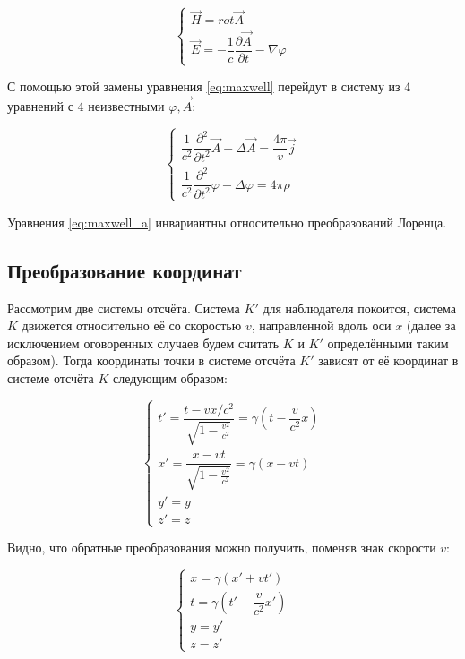 \documentclass{article}
\begin{document}
\begin{equation}
    \begin{cases}
    \vec{H}=rot\vec{A}\\
    \vec{E}=-\dfrac{1}{c}\dfrac{\partial\vec{A}}{\partial t}-\nabla\varphi
    \end{cases}
\end{equation}

С помощью этой замены уравнения \eqref{eq:maxwell} перейдут в систему из 4 уравнений с 4 неизвестными $\varphi,\vec{A}$:

\begin{equation}\label{eq:maxwell_a}
    \begin{cases}
    \dfrac{1}{c^2}\dfrac{\partial^2}{\partial t^2}\vec{A}-\Delta\vec{A}=\dfrac{4\pi}{v}\vec{j}\\
    \dfrac{1}{c^2}\dfrac{\partial^2}{\partial t^2}\varphi-\Delta\varphi=4\pi\rho
    \end{cases}
\end{equation}

Уравнения \eqref{eq:maxwell_a} инвариантны относительно преобразований Лоренца.

\subsection{Преобразование координат}

Рассмотрим две системы отсчёта. Система $K'$ для наблюдателя покоится, система $K$ движется относительно её со скоростью $v$, направленной вдоль оси $x$ (далее за исключением оговоренных случаев будем считать $K$ и $K'$ определёнными таким образом). Тогда координаты точки в системе отсчёта $K'$ зависят от её координат в системе отсчёта $K$ следующим образом:

\begin{equation}\label{eq:lorentz_coord}
    \begin{cases}
    t'=\dfrac{t-vx/c^2}{\sqrt{1-\frac{v^2}{c^2}}}=\gamma\left(t-\dfrac{v}{c^2}x\right)\\
    x'=\dfrac{x-vt}{\sqrt{1-\frac{v^2}{c^2}}}=\gamma\left(x-vt\right)\\
    y'=y\\
    z'=z
    \end{cases}
\end{equation}

Видно, что обратные преобразования можно получить, поменяв знак скорости $v$:

\begin{equation}
    \begin{cases}
    x=\gamma\left(x'+vt'\right)\\
    t=\gamma\left(t'+\dfrac{v}{c^2}x'\right)\\
    y=y'\\
    z=z'
    \end{cases}
\end{equation}
\end{document}
